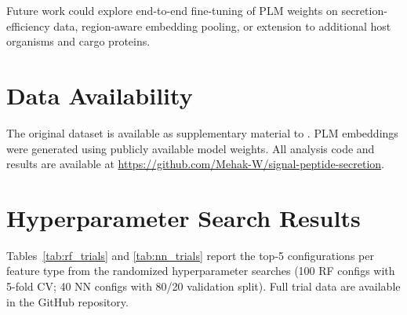 \documentclass[12pt]{article}
\begin{document}
Future work could explore end-to-end fine-tuning of PLM weights on secretion-efficiency data, region-aware embedding pooling, or extension to additional host organisms and cargo proteins.

\section*{Data Availability}

The original dataset is available as supplementary material to \citet{grasso2023}.
PLM embeddings were generated using publicly available model weights.
All analysis code and results are available at \url{https://github.com/Mehak-W/signal-peptide-secretion}.




\appendix

\section{Hyperparameter Search Results}
\label{app:hyperparam}

Tables~\ref{tab:rf_trials} and \ref{tab:nn_trials} report the top-5 configurations per feature type from the randomized hyperparameter searches (100 RF configs with 5-fold CV; 40 NN configs with 80/20 validation split).
Full trial data are available in the GitHub repository.
\end{document}
